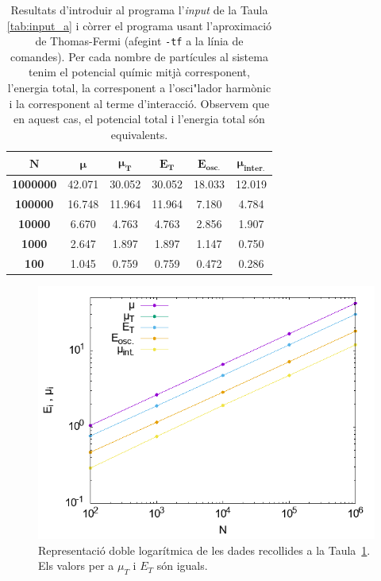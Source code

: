 \documentclass[a4paper]{article}
\begin{document}
\begin{table}[H]
\centering
\begin{tabular}{|c|c|c|c|c|c|}
\hline
    \rowcolor[HTML]{EFEFEF}
    $\mathbf{N}$ & $\boldsymbol{\mu}$ & $\boldsymbol{\mu_{\textbf{T}}}$ & $\boldsymbol{E_{\textbf{T}}}$ & $\boldsymbol{E_{\textbf{osc.}}}$ & $\boldsymbol{\mu_{\textbf{inter.}}}$ \\ \hline\hline
    \textbf{1000000}   & 42.071 & 30.052  & 30.052 & 18.033 & 12.019   \\ \hline
    \textbf{100000}    & 16.748 & 11.964  & 11.964 & 7.180  & 4.784    \\ \hline
    \textbf{10000}     & 6.670  & 4.763   & 4.763  & 2.856  & 1.907    \\ \hline
    \textbf{1000}      & 2.647  & 1.897   & 1.897  & 1.147  & 0.750    \\ \hline
    \textbf{100}       & 1.045  & 0.759   & 0.759  & 0.472  & 0.286    \\ \hline
\end{tabular}
    \caption{Resultats d'introduir al programa l'\textit{input} de la Taula \ref{tab:input_a} i còrrer el programa usant l'aproximació de Thomas-Fermi (afegint \texttt{-tf} a la línia de comandes). Per cada nombre de partícules al sistema tenim el potencial químic mitjà corresponent, l'energia total, la corresponent a l'osci"lador harmònic i la corresponent al terme d'interacció. Observem que en aquest cas, el potencial total i l'energia total són equivalents.}
    \label{tab:res_b}
\end{table}

\begin{figure}[H]
    \centering
    \includegraphics[width=0.7\linewidth]{../b.png}
\caption{Representació doble logarítmica de les dades recollides a la Taula~\ref{tab:res_b}. Els valors per a $\mu_T$ i $E_T$ són iguals.}
\label{fig:res_b}
\end{figure}
\end{document}
